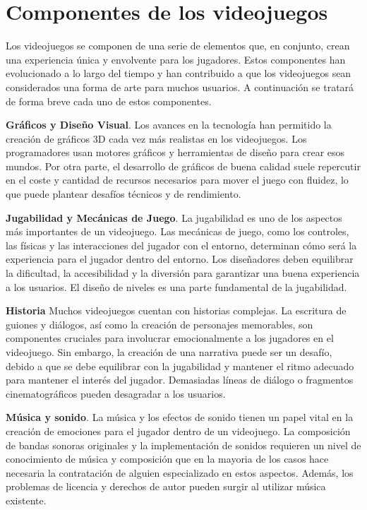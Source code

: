 \section{Componentes de los videojuegos}

Los videojuegos se componen de una serie de elementos que, en conjunto, crean una experiencia única y envolvente para los jugadores. Estos componentes han evolucionado a lo largo del tiempo y han contribuido a que los videojuegos sean considerados una forma de arte para muchos usuarios. A continuación se tratará de forma breve cada uno de estos componentes.

\textbf{Gráficos y Diseño Visual}. Los avances en la tecnología han permitido la creación de gráficos 3D cada vez más realistas en los videojuegos. Los programadores usan motores gráficos y herramientas de diseño para crear esos mundos. Por otra parte, el desarrollo de gráficos de buena calidad suele repercutir en el coste y cantidad de recursos necesarios para mover el juego con fluidez, lo que puede plantear desafíos técnicos y de rendimiento.

\textbf{Jugabilidad y Mecánicas de Juego}. La jugabilidad es uno de los aspectos más importantes de un videojuego. Las mecánicas de juego, como los controles, las físicas y las interacciones del jugador con el entorno, determinan cómo será la experiencia para el jugador dentro del entorno. Los diseñadores deben equilibrar la dificultad, la accesibilidad y la diversión para garantizar una buena experiencia a los usuarios. El diseño de niveles es una parte fundamental de la jugabilidad.

\textbf{Historia} Muchos videojuegos cuentan con historias complejas. La escritura de guiones y diálogos, así como la creación de personajes memorables, son componentes cruciales para involucrar emocionalmente a los jugadores en el videojuego. Sin embargo, la creación de una narrativa puede ser un desafío, debido a que se debe equilibrar con la jugabilidad y mantener el ritmo adecuado para mantener el interés del jugador. Demasiadas líneas de diálogo o fragmentos cinematográficos pueden desagradar a los usuarios.

\textbf{Música y sonido}. La música y los efectos de sonido tienen un papel vital en la creación de emociones para el jugador dentro de un videojuego. La composición de bandas sonoras originales y la implementación de sonidos requieren un nivel de conocimiento de música y composición que en la mayoria de los casos hace necesaria la contratación de alguien especializado en estos aspectos. Además, los problemas de licencia y derechos de autor pueden surgir al utilizar música existente.

